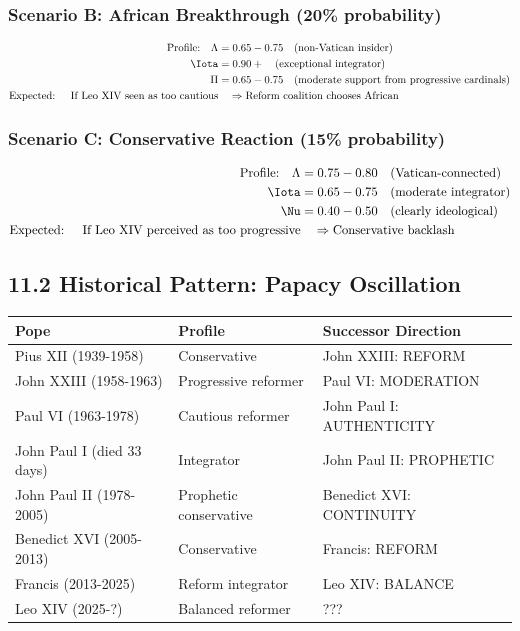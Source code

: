 \documentclass[11pt]{article}
\begin{document}
\subsubsection{Scenario B: African Breakthrough (20\% probability)}
\begin{align*}
\text{Profile:} \quad \Lambda &= 0.65-0.75 \quad \text{(non-Vatican insider)} \\
\Iota &= 0.90+ \quad \text{(exceptional integrator)} \\
\Pi &= 0.65-0.75 \quad \text{(moderate support from progressive cardinals)} \\
\text{Expected: } \quad \text{If Leo XIV seen as too cautious} &\quad \Rightarrow \text{Reform coalition chooses African}
\end{align*}

\subsubsection{Scenario C: Conservative Reaction (15\% probability)}
\begin{align*}
\text{Profile:} \quad \Lambda &= 0.75-0.80 \quad \text{(Vatican-connected)} \\
\Iota &= 0.65-0.75 \quad \text{(moderate integrator)} \\
\Nu &= 0.40-0.50 \quad \text{(clearly ideological)} \\
\text{Expected: } \quad \text{If Leo XIV perceived as too progressive} &\quad \Rightarrow \text{Conservative backlash}
\end{align*}

\subsection{11.2 Historical Pattern: Papacy Oscillation}

\begin{table}[h]
\centering
\begin{tabular}{|l|l|l|}
\hline
\textbf{Pope} & \textbf{Profile} & \textbf{Successor Direction} \\
\hline
Pius XII (1939-1958) & Conservative & John XXIII: REFORM \\
John XXIII (1958-1963) & Progressive reformer & Paul VI: MODERATION \\
Paul VI (1963-1978) & Cautious reformer & John Paul I: AUTHENTICITY \\
John Paul I (died 33 days) & Integrator & John Paul II: PROPHETIC \\
John Paul II (1978-2005) & Prophetic conservative & Benedict XVI: CONTINUITY \\
Benedict XVI (2005-2013) & Conservative & Francis: REFORM \\
Francis (2013-2025) & Reform integrator & Leo XIV: BALANCE \\
Leo XIV (2025-?) & Balanced reformer & ??? \\
\hline
\end{tabular}
\end{table}
\end{document}
